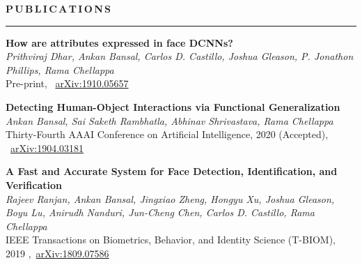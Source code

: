 \documentclass[11pt, a4paper]{article}
\begin{document}
%

\textbf{P\,U\,B\,L\,I\,C\,A\,T\,I\,O\,N\,S}
\vspace{5pt}
\hrule
\vspace{7pt}

\textbf{How are attributes expressed in face DCNNs?}\\
\textit{Prithviraj Dhar, Ankan Bansal, Carlos D. Castillo, Joshua Gleason, P. Jonathon Phillips,
Rama Chellappa}\\
Pre-print, ~\href{https://arxiv.org/abs/1910.05657}{arXiv:1910.05657}

\vspace{3pt}

\textbf{Detecting Human-Object Interactions via Functional Generalization}\\
\textit{Ankan Bansal, Sai Saketh Rambhatla, Abhinav Shrivastava, Rama Chellappa}\\
Thirty-Fourth AAAI Conference on Artificial Intelligence, 2020 (Accepted), ~\href{https://arxiv.org/abs/1904.03181}{arXiv:1904.03181}

\vspace{3pt}

\textbf{A Fast and Accurate System for Face Detection, Identification, and Verification} \\
\textit{Rajeev Ranjan, Ankan Bansal, Jingxiao Zheng, Hongyu Xu, Joshua Gleason, Boyu Lu, Anirudh
Nanduri, Jun-Cheng Chen, Carlos D. Castillo, Rama Chellappa}\\
IEEE Transactions on Biometrics, Behavior, and Identity Science (T-BIOM), 2019 ,~\href{https://arxiv.org/abs/1809.07586}{arXiv:1809.07586}
\end{document}
